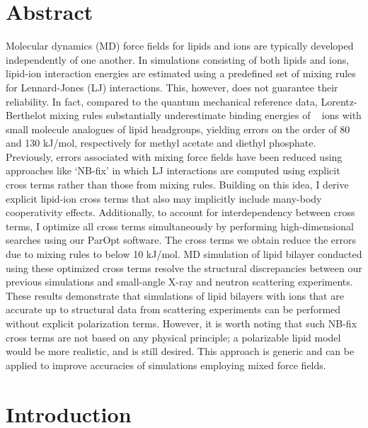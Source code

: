 \section{Abstract}
Molecular dynamics (MD) force fields for lipids and ions are typically developed independently of one another. 
In simulations consisting of both lipids and ions, 
lipid-ion interaction energies are estimated using a predefined 
set of mixing rules for Lennard-Jones (LJ) interactions. 
This, however, does not guarantee their reliability. 
In fact, compared to the quantum mechanical reference data, 
Lorentz-Berthelot mixing 
rules substantially underestimate binding energies of \na~ ions with small 
molecule analogues of lipid headgroups, yielding errors on the order of 80 and 130 kJ/mol, 
respectively for methyl acetate and diethyl phosphate. Previously, errors 
associated with mixing force fields have been reduced using approaches like `NB-fix' 
in which LJ interactions are computed using explicit cross terms rather than 
those from mixing rules. Building on this idea, I derive explicit 
lipid-ion cross terms that also may implicitly include many-body 
cooperativity effects.
Additionally, to account for interdependency between cross terms, 
I optimize all cross terms simultaneously by 
performing high-dimensional searches using our ParOpt software. 
The cross terms we obtain reduce the 
errors due to mixing rules to below 10 kJ/mol. 
MD simulation of lipid bilayer conducted using these 
optimized cross terms resolve the structural discrepancies between our previous 
simulations and small-angle X-ray and neutron scattering experiments. 
These results demonstrate that simulations of lipid bilayers with ions that are 
accurate up to structural data from scattering experiments 
can be performed without explicit polarization terms. 
However, it is worth noting that such NB-fix cross terms are
not based on any physical principle; a polarizable lipid model would be more 
realistic, and is still desired. 
This approach is generic and can be applied to 
improve accuracies of simulations employing mixed force fields.


\section{Introduction}

